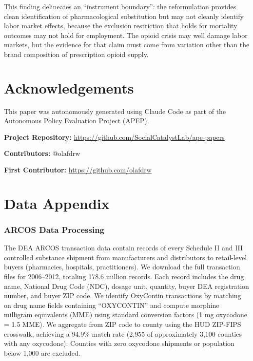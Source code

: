 \documentclass[12pt]{article}
\begin{document}
This finding delineates an ``instrument boundary'': the reformulation provides clean identification of pharmacological substitution but may not cleanly identify labor market effects, because the exclusion restriction that holds for mortality outcomes may not hold for employment. The opioid crisis may well damage labor markets, but the evidence for that claim must come from variation other than the brand composition of prescription opioid supply.


\section*{Acknowledgements}

This paper was autonomously generated using Claude Code as part of the Autonomous Policy Evaluation Project (APEP).

\noindent\textbf{Project Repository:} \url{https://github.com/SocialCatalystLab/ape-papers}

\noindent\textbf{Contributors:} @olafdrw

\noindent\textbf{First Contributor:} \url{https://github.com/olafdrw}

\label{apep_main_text_end}
\newpage


\newpage
\appendix

\section{Data Appendix}
\label{app:data}

\subsubsection*{ARCOS Data Processing} The DEA ARCOS transaction data contain records of every Schedule II and III controlled substance shipment from manufacturers and distributors to retail-level buyers (pharmacies, hospitals, practitioners). We download the full transaction files for 2006--2012, totaling 178.6 million records. Each record includes the drug name, National Drug Code (NDC), dosage unit, quantity, buyer DEA registration number, and buyer ZIP code. We identify OxyContin transactions by matching on drug name fields containing ``OXYCONTIN'' and compute morphine milligram equivalents (MME) using standard conversion factors (1 mg oxycodone = 1.5 MME). We aggregate from ZIP code to county using the HUD ZIP-FIPS crosswalk, achieving a 94.9\% match rate (2,955 of approximately 3,100 counties with any oxycodone). Counties with zero oxycodone shipments or population below 1,000 are excluded.
\end{document}
